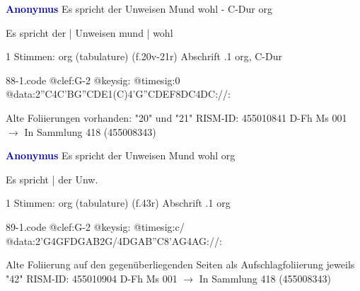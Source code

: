 \documentclass[twocolumn]{book}
\begin{document}
\newline \par \vspace{7pt} \textcolor{darkblue}{\textbf{Anonymus  }}
\newline Es spricht der Unweisen Mund wohl - C-Dur
\newline org
\newline \begin{itshape}[f.20v, at left:] Es spricht der | Unweisen mund | wohl\end{itshape} 
\newline \textcolor{darkblue}{}  1 Stimmen: org (tabulature)  (f.20v-21r)
\newline Abschrift
.1  org, C-Dur  
\begin{filecontents*}{88-1.code}
@clef:G-2
@keysig:
@timesig:0
@data:2''C4C'BG''CDE1(C)4'G''CDEF{8DC}4DC://:
\end{filecontents*}
\newline
%
\newline Alte Foliierungen vorhanden: "20" und "21"
\newline RISM-ID: 455010841
\newline D-Fh  Ms 001
\newline $\rightarrow$ In Sammlung 418 (455008343)
      
\newline \par \vspace{7pt} \textcolor{darkblue}{\textbf{Anonymus  }}
\newline Es spricht der Unweisen Mund wohl
\newline org
\newline \begin{itshape}[f.43r, at left:] Es spricht | der Unw.\end{itshape} 
\newline \textcolor{darkblue}{}  1 Stimmen: org (tabulature)  (f.43r)
\newline Abschrift
.1  org  
\begin{filecontents*}{89-1.code}
@clef:G-2
@keysig:
@timesig:c/
@data:2'G4GFDGAB2G/4DGAB''C{8'AG}4AG://:
\end{filecontents*}
\newline
%
\newline Alte Foliierung auf den gegenüberliegenden Seiten als Aufschlagfoliierung jeweils "42"
\newline RISM-ID: 455010904
\newline D-Fh  Ms 001
\newline $\rightarrow$ In Sammlung 418 (455008343)
      
\end{document}
